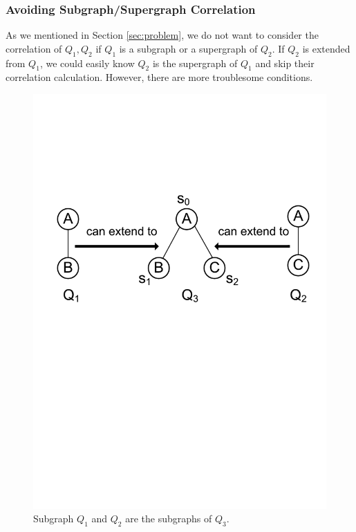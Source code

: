 \subsubsection{Avoiding Subgraph/Supergraph Correlation}\label{subsec:avoiding}
As we mentioned in Section \ref{sec:problem}, we do not want to consider the correlation of $Q_1,Q_2$ if $Q_1$ is a subgraph or a supergraph of $Q_2$. If $Q_2$ is extended from $Q_1$, we could easily know $Q_2$ is the supergraph of $Q_1$ and skip their correlation calculation. However, there are more troublesome conditions.


\begin{figure}[t!]
	\centering
	\includegraphics[scale=0.32]{images/avoiding}
	\vspace{-2mm}
	\caption{\scriptsize Subgraph $Q_1$ and $Q_2$ are the subgraphs of $Q_3$.}
	\label{fig:avoiding}
	\vspace{-6mm}
\end{figure}


